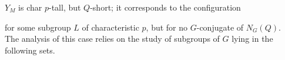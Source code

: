 \documentclass{amsart}
\numberwithin{equation}{section}
\theoremstyle{definition}
\theoremstyle{subresult}
\theoremstyle{caseresult}
\newcommand{\<}{\langle}
\renewcommand{\>}{\rangle}
\begin{document}
\begin{enumerate}
\begin{enumerate}[label=(Asym: \alph*), itemindent=0.5cm]
					 $Y_M$ is char $p$-tall, but $Q$-short; it corresponds to the configuration
					 \begin{center}
					 \end{center}
					 for some subgroup $L$ of characteristic $p$, but for no $G$-conjugate of $N_G(Q)$.\\
                The analysis of this case relies on the study of subgroups of $G$ lying in the following sets.
		

\end{enumerate}
\end{enumerate}
\end{document}
